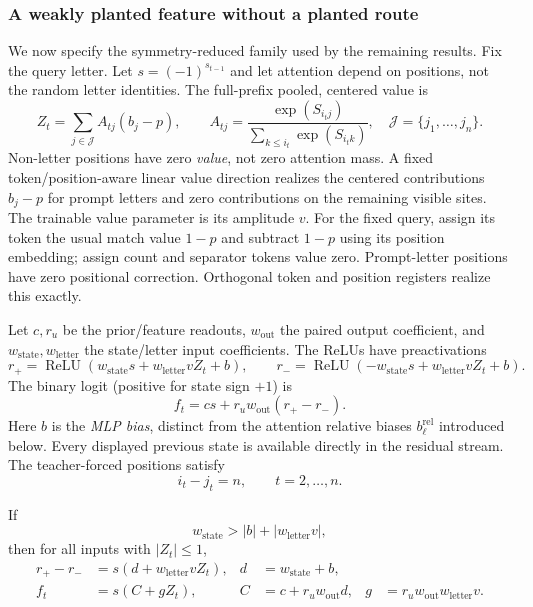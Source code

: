 \subsubsection{A weakly planted feature without a planted route}
\label{app:weak-routing-family}

We now specify the symmetry-reduced family used by the remaining results.
Fix the query letter. Let $s=(-1)^{s_{t-1}}$ and let attention depend on positions, not the
random letter identities.  The full-prefix pooled, centered value is
\begin{equation}\label{eq:lr-centered-value}
 Z_t=\sum_{j\in\mathcal J}A_{tj}(b_j-p),\qquad
 A_{tj}=\frac{\exp(S_{i_tj})}{\sum_{k\le i_t}\exp(S_{i_tk})},
 \quad \mathcal J=\{j_1,\ldots,j_n\}.
\end{equation}
Non-letter positions have zero \emph{value}, not zero attention mass.
A fixed token/position-aware linear value direction realizes the centered contributions
$b_j-p$ for prompt letters and zero contributions on the remaining visible
sites.  The trainable value parameter is its amplitude $v$. For the fixed query, assign its token the usual match
value $1-p$ and subtract $1-p$ using its position embedding; assign count
and separator tokens value zero. Prompt-letter positions have zero positional
correction. Orthogonal token and position registers realize this exactly.

Let $c,r_u$ be the prior/feature readouts, $w_{\mathrm{out}}$ the paired output coefficient,
and $w_{\mathrm{state}},w_{\mathrm{letter}}$ the state/letter input coefficients. The ReLUs have preactivations
\begin{equation}\label{eq:lr-gates}
 r_+=\operatorname{ReLU}(w_{\mathrm{state}} s+w_{\mathrm{letter}} vZ_t+b),\qquad
 r_-=\operatorname{ReLU}(-w_{\mathrm{state}} s+w_{\mathrm{letter}} vZ_t+b).
\end{equation}
The binary logit (positive for state sign $+1$) is
\begin{equation}\label{eq:lr-factor-logit}
 f_t=cs+r_uw_{\mathrm{out}}(r_+-r_-).
\end{equation}
Here $b$ is the \emph{MLP bias}, distinct from the attention
relative biases $b_\ell^{\mathrm{rel}}$ introduced below.
Every displayed previous state is available directly in the residual stream.
The teacher-forced positions satisfy
\begin{equation}\label{eq:lr-constant-lag}
 i_t-j_t=n,\qquad t=2,\ldots,n.
\end{equation}

If
\begin{equation}\label{eq:lr-gate-condition}
 w_{\mathrm{state}}>|b|+|w_{\mathrm{letter}} v|,
\end{equation}
then for all inputs with $|Z_t|\le1$,
\begin{equation}\label{eq:lr-feature-param}
 \begin{aligned}
 r_+-r_-&=s(d+{w_{\mathrm{letter}} v} Z_t),& d&=w_{\mathrm{state}}+b,\\
 f_t&=s(C+gZ_t),& C&=c+r_uw_{\mathrm{out}} d,& g&=r_uw_{\mathrm{out}} {w_{\mathrm{letter}} v}.
 \end{aligned}
\end{equation}

